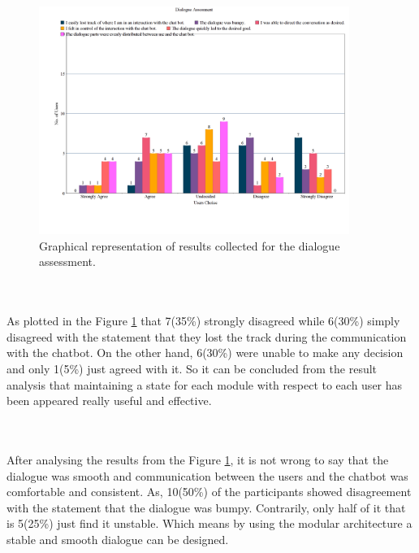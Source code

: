 \begin{figure}[!h]
    \centering
    \includegraphics[width=0.9\textwidth]{img/Dialogue_Assessment.png}
    \caption{Graphical representation of results collected for the dialogue assessment.}
    \label{fig:dialogAssess}
\end{figure}
\\~\\
As plotted in the Figure \ref{fig:dialogAssess} that 7(35\%) strongly disagreed while 6(30\%) simply disagreed with the statement that they lost the track during the communication with the chatbot. On the other hand, 6(30\%) were unable to make any decision and only 1(5\%) just agreed with it. So it can be concluded from the result analysis that maintaining a state for each module with respect to each user has been appeared really useful and effective.

\\~\\
After analysing the results from the Figure \ref{fig:dialogAssess}, it is not wrong to say that the dialogue was smooth and communication between the users and the chatbot was comfortable and consistent. As, 10(50\%) of the participants showed disagreement with the statement that the dialogue was bumpy. Contrarily, only half of it that is 5(25\%) just find it unstable. Which means by using the modular architecture a stable and smooth dialogue can be designed.

